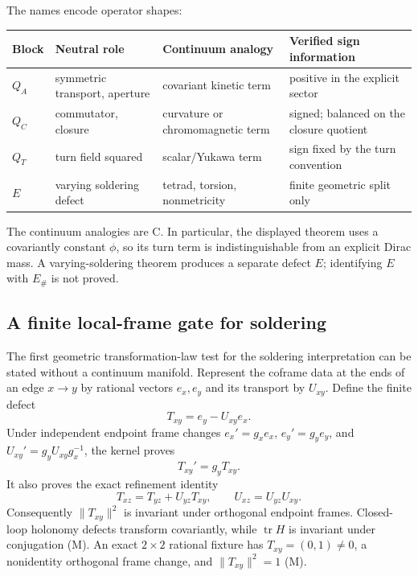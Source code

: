 \documentclass[11pt]{article}
\newcommand{\Mtag}{\textcolor{verified}{\textsc{M}}}
\newcommand{\Ctag}{\textcolor{conjectural}{\textsc{C}}}
\newcommand{\tr}{\operatorname{tr}}
\begin{document}
The names encode operator shapes:
\begin{center}
\begin{tabularx}{\textwidth}{@{}l >{\raggedright\arraybackslash}p{} X >{\raggedright\arraybackslash}p{}@{}}
\toprule
Block & Neutral role & Continuum analogy & Verified sign information\\
\midrule
$Q_A$ & symmetric transport, aperture & covariant kinetic term & positive in the explicit sector\\
$Q_C$ & commutator, closure & curvature or chromomagnetic term & signed; balanced on the closure quotient\\
$Q_T$ & turn field squared & scalar/Yukawa term & sign fixed by the turn convention\\
$E$ & varying soldering defect & tetrad, torsion, nonmetricity & finite geometric split only\\
\bottomrule
\end{tabularx}
\end{center}
The continuum analogies are \Ctag.  In particular, the displayed theorem uses a
covariantly constant $\phi$, so its turn term is indistinguishable from an
explicit Dirac mass.  A varying-soldering theorem produces a separate defect
$E$; identifying $E$ with $E_\#$ is not proved.

\subsection{A finite local-frame gate for soldering}

The first geometric transformation-law test for the soldering interpretation
can be stated without a continuum manifold.  Represent the coframe data at the
ends of an edge $x\to y$ by rational vectors $e_x,e_y$ and its transport by
$U_{xy}$.  Define the finite defect
\begin{equation}\label{eq:solderdefect}
  T_{xy}=e_y-U_{xy}e_x.
\end{equation}
Under independent endpoint frame changes
$e_x'=g_xe_x$, $e_y'=g_ye_y$, and
$U_{xy}'=g_yU_{xy}g_x^{-1}$, the kernel proves
\begin{equation}\label{eq:soldercov}
  T_{xy}'=g_yT_{xy}.
\end{equation}
It also proves the exact refinement identity
\begin{equation}\label{eq:solderrefine}
  T_{xz}=T_{yz}+U_{yz}T_{xy},
  \qquad U_{xz}=U_{yz}U_{xy}.
\end{equation}
Consequently $\lVert T_{xy}\rVert^2$ is invariant under orthogonal endpoint
frames.  Closed-loop holonomy defects transform covariantly, while
$\tr H$ is invariant under conjugation (\Mtag).  An exact $2\times2$ rational
fixture has $T_{xy}=(0,1)\neq0$, a nonidentity orthogonal frame change, and
$\lVert T_{xy}\rVert^2=1$ (\Mtag).
\end{document}
